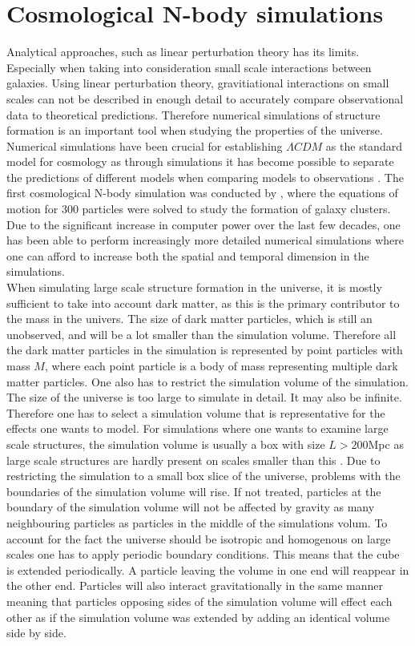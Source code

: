 \section{Cosmological N-body simulations}
Analytical approaches, such as linear perturbation theory has its limits.
Especially when taking into consideration small scale interactions between
galaxies. Using linear perturbation theory, gravitiational interactions on small scales can not be described in
enough detail to accurately compare observational data to theoretical
predictions. Therefore numerical simulations of structure formation is an
important tool when studying the properties of the universe. Numerical
simulations have been crucial for establishing $\Lambda CDM$ as the standard
model for cosmology as through simulations it has become possible to separate
the predictions of different models when comparing models to observations
\cite[p.~361]{schneider2006extragalactic}. The first cosmological N-body
simulation was conducted by \cite{PeeblesPJE1970SotC}, where the equations of
motion for $300$ particles were solved to study the formation of galaxy clusters. Due to the significant increase in
computer power over the last few decades, one has been able to perform
increasingly more detailed numerical simulations where one can afford to
increase both the spatial and temporal dimension in the simulations.\\

When simulating large scale structure formation in the universe, it is mostly
sufficient to take into account dark matter, as this is the primary contributor
to the mass in the univers. The size of dark matter particles, which is still an
unobserved, and will be a lot smaller than the simulation volume. Therefore
all the dark matter particles in the simulation is represented by point
particles with mass $M$, where each point particle is a body of mass
representing multiple dark matter particles. One also has to restrict the
simulation volume of the simulation. The size of the universe is too large to
simulate in detail. It may also be infinite. Therefore one has to select a
simulation volume that is representative for the effects one wants to model. For
simulations where one wants to examine large scale structures, the simulation
volume is usually a box with size $L>200$Mpc as large scale structures are hardly present on
scales smaller than this \cite[p.~362]{schneider2006extragalactic}. Due to
restricting the simulation to a small box slice of the universe, problems with
the boundaries of the simulation volume will rise. If not treated, particles at
the boundary of the simulation volume will not be affected by gravity as many
neighbouring particles as particles in the middle of the simulations volum. To
account for the fact the universe should be isotropic and homogenous on large
scales one has to apply periodic boundary conditions. This means that the cube
is extended periodically. A particle leaving the volume in one end will reappear
in the other end. Particles will also interact gravitationally in the same
manner meaning that particles opposing sides of the simulation volume will
effect each other as if the simulation volume was extended by adding an
identical volume side by side.

